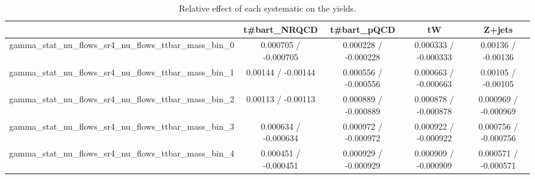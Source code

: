 \documentclass[10pt]{article}
\begin{document}
\begin{table}[htbp]
\begin{center}
\begin{tabular}{|c|c|c|c|c|}
\hline 
      & t#bar{t}_{NRQCD}      & t#bar{t}_{pQCD}      & tW      & Z+jets \\ 
\hline 
  gamma_stat_nu_flows_sr4_nu_flows_ttbar_mass_bin_0 & 0.000705 / -0.000705 & 0.000228 / -0.000228 & 0.000333 / -0.000333 & 0.00136 / -0.00136 \\ 
  gamma_stat_nu_flows_sr4_nu_flows_ttbar_mass_bin_1 & 0.00144 / -0.00144 & 0.000556 / -0.000556 & 0.000663 / -0.000663 & 0.00105 / -0.00105 \\ 
  gamma_stat_nu_flows_sr4_nu_flows_ttbar_mass_bin_2 & 0.00113 / -0.00113 & 0.000889 / -0.000889 & 0.000878 / -0.000878 & 0.000969 / -0.000969 \\ 
  gamma_stat_nu_flows_sr4_nu_flows_ttbar_mass_bin_3 & 0.000634 / -0.000634 & 0.000972 / -0.000972 & 0.000922 / -0.000922 & 0.000756 / -0.000756 \\ 
  gamma_stat_nu_flows_sr4_nu_flows_ttbar_mass_bin_4 & 0.000451 / -0.000451 & 0.000929 / -0.000929 & 0.000909 / -0.000909 & 0.000571 / -0.000571 \\ 
\hline 
\end{tabular} 
\caption{Relative effect of each systematic on the yields.} 
\end{center} 
\end{table} 
\end{document}
